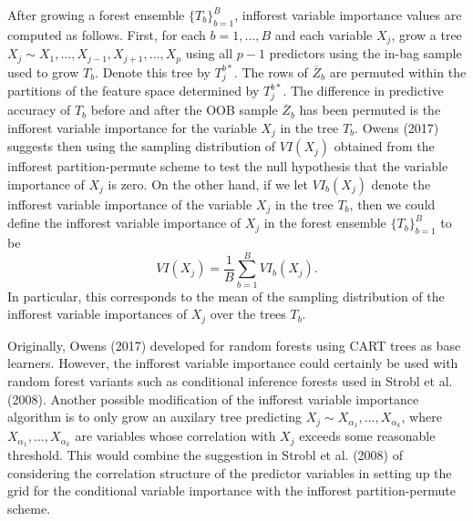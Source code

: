 \documentclass[12pt,twoside]{reedthesis}
\theoremstyle{definition}
\theoremstyle{definition}
\theoremstyle{definition}
\theoremstyle{remark}
\begin{document}
After growing a forest ensemble \(\{T_b\}_{b=1}^B\), infforest variable
importance values are computed as follows. First, for each
\(b=1,\ldots,B\) and each variable \(X_j\), grow a tree
\(X_j\sim X_1,\ldots,X_{j-1},X_{j+1},\ldots,X_p\) using all \(p-1\)
predictors using the in-bag sample used to grow \(T_b\). Denote this
tree by \(T_j^{b*}\). The rows of \(\overline{Z}_b\) are permuted within
the partitions of the feature space determined by \(T_j^{b*}\). The
difference in predictive accuracy of \(T_b\) before and after the OOB
sample \(\overline{Z}_b\) has been permuted is the infforest variable
importance for the variable \(X_j\) in the tree \(T_b\). Owens (2017)
suggests then using the sampling distribution of \(VI(X_j)\) obtained
from the infforest partition-permute scheme to test the null hypothesis
that the variable importance of \(X_j\) is zero. On the other hand, if
we let \(VI_b(X_j)\) denote the infforest variable importance of the
variable \(X_j\) in the tree \(T_b\), then we could define the infforest
variable importance of \(X_j\) in the forest ensemble
\(\{T_b\}_{b=1}^B\) to be \[VI(X_j)=\frac{1}{B}\sum_{b=1}^B VI_b(X_j).\]
In particular, this corresponds to the mean of the sampling distribution
of the infforest variable importances of \(X_j\) over the trees \(T_b\).
\par

Originally, Owens (2017) developed for random forests using CART trees
as base learners. However, the infforest variable importance could
certainly be used with random forest variants such as conditional
inference forests used in Strobl et al. (2008). Another possible
modification of the infforest variable importance algorithm is to only
grow an auxilary tree predicting
\(X_j\sim X_{\alpha_1},\ldots,X_{\alpha_k}\), where
\(X_{\alpha_1},\ldots,X_{\alpha_k}\) are variables whose correlation
with \(X_j\) exceeds some reasonable threshold. This would combine the
suggestion in Strobl et al. (2008) of considering the correlation
structure of the predictor variables in setting up the grid for the
conditional variable importance with the infforest partition-permute
scheme. \par
\end{document}
